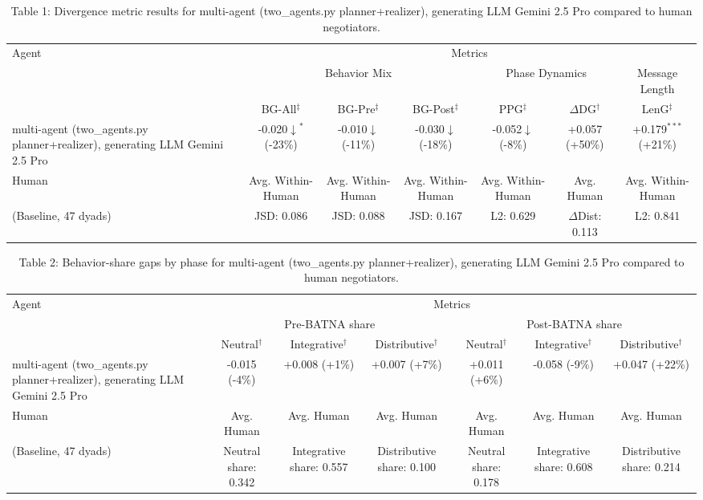 \begin{table}[t]
\centering
\begin{tabular}{lcccccc}
\toprule
\multirow{3}{*}{Agent} & \multicolumn{6}{c}{Metrics} \\
\cmidrule(lr){2-7}
 & \multicolumn{3}{c}{Behavior Mix} & \multicolumn{2}{c}{Phase Dynamics} & \multicolumn{1}{c}{Message Length} \\
\cmidrule(lr){2-4} \cmidrule(lr){5-6} \cmidrule(lr){7-7}
 & BG-All$^\ddagger$ & BG-Pre$^\ddagger$ & BG-Post$^\ddagger$ & PPG$^\ddagger$ & $\Delta$DG$^\dagger$ & LenG$^\ddagger$ \\
\midrule
multi-agent (two_agents.py planner+realizer), generating LLM Gemini 2.5 Pro & -0.020$\downarrow$$^{*}$ (-23\%) & -0.010$\downarrow$ (-11\%) & -0.030$\downarrow$ (-18\%) & -0.052$\downarrow$ (-8\%) & +0.057 (+50\%) & +0.179$^{***}$ (+21\%) \\
\midrule
Human & Avg. Within-Human & Avg. Within-Human & Avg. Within-Human & Avg. Within-Human & Avg. Human & Avg. Within-Human \\
(Baseline, 47 dyads) & JSD: 0.086 & JSD: 0.088 & JSD: 0.167 & L2: 0.629 & $\Delta$Dist: 0.113 & L2: 0.841 \\
\bottomrule
\end{tabular}
\caption{Table 1: Divergence metric results for multi-agent (two_agents.py planner+realizer), generating LLM Gemini 2.5 Pro compared to human negotiators.}
\end{table}

\begin{table}[t]
\centering
\begin{tabular}{lcccccc}
\toprule
\multirow{3}{*}{Agent} & \multicolumn{6}{c}{Metrics} \\
\cmidrule(lr){2-7}
 & \multicolumn{3}{c}{Pre-BATNA share} & \multicolumn{3}{c}{Post-BATNA share} \\
\cmidrule(lr){2-4} \cmidrule(lr){5-7}
 & Neutral$^\dagger$ & Integrative$^\dagger$ & Distributive$^\dagger$ & Neutral$^\dagger$ & Integrative$^\dagger$ & Distributive$^\dagger$ \\
\midrule
multi-agent (two_agents.py planner+realizer), generating LLM Gemini 2.5 Pro & -0.015 (-4\%) & +0.008 (+1\%) & +0.007 (+7\%) & +0.011 (+6\%) & -0.058 (-9\%) & +0.047 (+22\%) \\
\midrule
Human & Avg. Human & Avg. Human & Avg. Human & Avg. Human & Avg. Human & Avg. Human \\
(Baseline, 47 dyads) & Neutral share: 0.342 & Integrative share: 0.557 & Distributive share: 0.100 & Neutral share: 0.178 & Integrative share: 0.608 & Distributive share: 0.214 \\
\bottomrule
\end{tabular}
\caption{Table 2: Behavior-share gaps by phase for multi-agent (two_agents.py planner+realizer), generating LLM Gemini 2.5 Pro compared to human negotiators.}
\end{table}
